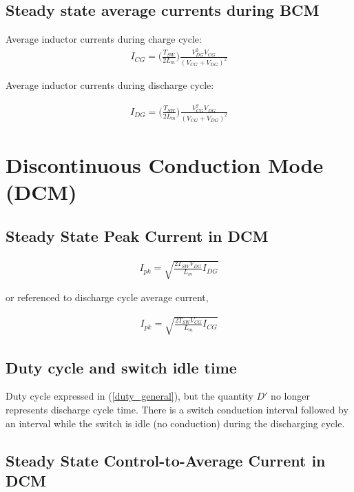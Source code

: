 \documentclass{scrartcl}
\begin{document}
		\subsection{Steady state average currents during BCM}
			Average inductor currents during charge cycle:
			\begin{align}
			I_{CG} = \bigg(\frac{T_{SW}}{2L_m}\bigg)\frac{V_{DG}^2 V_{CG}}{(V_{CG} + V_{DG})^2} 
			\end{align}			

		   Average inductor currents during discharge cycle:

			\begin{align}
			I_{DG} = \bigg(\frac{T_{SW}}{2L_m}\bigg)\frac{V_{CG}^2 V_{DG}}{(V_{CG} + V_{DG})^2} 
			\end{align}		

	\section{Discontinuous Conduction Mode (DCM)}
	
		\subsection{Steady State Peak Current in DCM}
		
		\begin{align}
		I_{pk} = \sqrt{\frac{2T_{SW}V_{DG}}{L_m}I_{DG}}
		\end{align}	
		
		or referenced to discharge cycle average current,
	
		\begin{align}
		I_{pk} = \sqrt{\frac{2T_{SW}V_{CG}}{L_m}I_{CG}}
		\end{align}	
		
		\subsection{Duty cycle and switch idle time}
		Duty cycle expressed in (\ref{duty_general}), but the quantity $D'$ no longer represents discharge cycle time.  There is a switch conduction interval followed by an interval while the switch is idle (no conduction) during the discharging cycle.
		
		\subsection{Steady State Control-to-Average Current in DCM}
\end{document}
